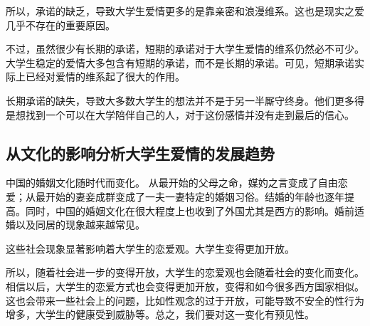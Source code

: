 \documentclass[UTF8,a4paper]{ctexart}
\begin{document}
所以，承诺的缺乏，导致大学生爱情更多的是靠亲密和浪漫维系。这也是现实之爱几乎不存在的重要原因。

不过，虽然很少有长期的承诺，短期的承诺对于大学生爱情的维系仍然必不可少。大学生稳定的爱情大多包含有短期的承诺，而不是长期的承诺。可见，短期承诺实际上已经对爱情的维系起了很大的作用。

长期承诺的缺失，导致大多数大学生的想法并不是于另一半厮守终身。他们更多得是想找到一个可以在大学陪伴自己的人，对于这份感情并没有走到最后的信心。

\subsection{从文化的影响分析大学生爱情的发展趋势}

中国的婚姻文化随时代而变化。
从最开始的父母之命，媒妁之言变成了自由恋爱；从最开始的妻妾成群变成了一夫一妻特定的婚姻习俗。结婚的年龄也逐年提高。同时，中国的婚姻文化在很大程度上也收到了外国尤其是西方的影响。婚前适婚以及同居的现象越来越常见。

这些社会现象显著影响着大学生的恋爱观。大学生变得更加开放。

所以，随着社会进一步的变得开放，大学生的恋爱观也会随着社会的变化而变化。相信以后，大学生的恋爱方式也会变得更加开放，变得和如今很多西方国家相似。这也会带来一些社会上的问题，比如性观念的过于开放，可能导致不安全的性行为增多，大学生的健康受到威胁等。总之，我们要对这一变化有预见性。




 \renewcommand\refname{参考文献}

\end{document}
